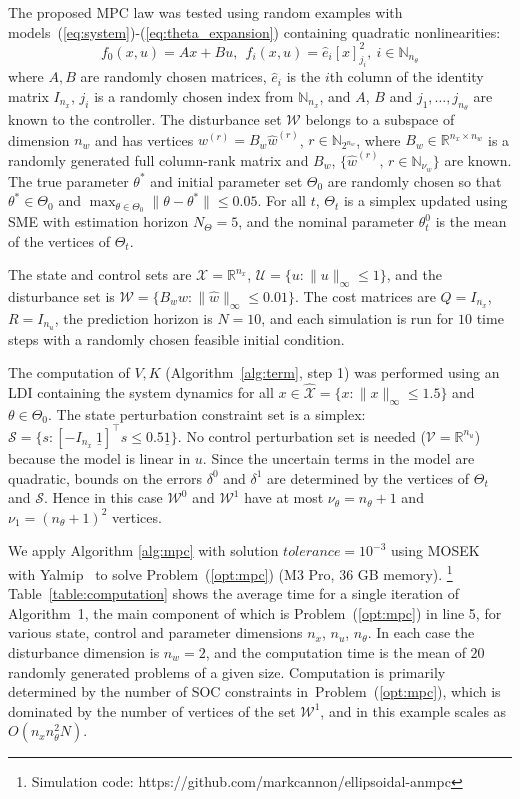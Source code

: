 \documentclass{IEEEtran}
\theoremstyle{definition}
\theoremstyle{remark}
\def\algtol{\mathit{tolerance}}
\begin{document}
The proposed MPC law was tested using random examples with models~(\ref{eq:system})-(\ref{eq:theta_expansion}) containing quadratic nonlinearities:
\[
  f_0(x,u) = Ax + Bu, \ \ f_i(x,u) = \hat{e}_i [x]_{j_i}^2, \ i\in \mathbb{N}_{n_\theta}
\]
where $A,B$ are randomly chosen matrices,
$\hat{e}_i$ is the $i$th column of the identity matrix $I_{n_x}$,
$j_i$ is a randomly chosen index from $\mathbb{N}_{n_x}$,
and $A$, $B$ and $j_1,\ldots,j_{n_\theta}$ are known to the controller.
% 
The disturbance set $\mathcal{W}$ belongs to a subspace of dimension $n_w$ and has vertices $w^{(r)} = B_w \hat{w}^{(r)}$, $r\in\mathbb{N}_{2^{n_w}}$, where $B_w\in\mathbb{R}^{n_x\times n_w}$ is a randomly generated full column-rank matrix and $B_w$, $\{\hat{w}^{(r)},\, r\in\mathbb{N}_{\nu_w}\}$ are known.
%
The true parameter $\theta^\ast$ and initial parameter set $\Theta_0$ are randomly chosen so that $\theta^\ast\in\Theta_0$ and $\max_{\theta\in\Theta_0}\| \theta - \theta^\ast\| \leq 0.05$.
For all $t$, $\Theta_t$ is a simplex updated using SME with estimation horizon $N_\Theta = 5$, and the nominal parameter $\theta^0_t$ is the mean of the vertices of $\Theta_t$.

The state and control sets are $\mathcal{X}= \mathbb{R}^{n_x}$, $\mathcal{U} = \{u: \| u \|_\infty \leq 1\}$, and the disturbance set is $\mathcal{W}=\{ B_w \hat{w} : \|\hat{w}\|_\infty \leq 0.01\}$. The cost matrices are $Q = I_{n_x}$, $R = I_{n_u}$, the prediction horizon is $N = 10$, and each simulation is run for $10$ time steps with a randomly chosen feasible initial condition.

The computation of $V,K$ (Algorithm~\ref{alg:term}, step 1) was performed using an LDI containing the system dynamics for all $x\in\hat{\mathcal{X}} = \{x : \|x\|_\infty \leq 1.5 \}$ and  $\theta\in\Theta_0$. The state perturbation constraint set is a simplex: $\mathcal{S} = \{s : [-I_{n_x} \ \underline{1}]^\top s \leq 0.5\underline{1}\}$. No control perturbation set is needed ($\mathcal{V} = \mathbb{R}^{n_u}$) because the model is linear in $u$. Since the uncertain terms in the model are quadratic, bounds on the errors $\delta^0$ and $\delta^1$ are determined by the vertices of $\Theta_t$ and $\mathcal{S}$. Hence in this case $\mathcal{W}^0$ and $\mathcal{W}^1$ have at most $\nu_\theta= n_\theta+1$ and $\nu_1 = (n_\theta+1)^2$ vertices.

We apply Algorithm \ref{alg:mpc} with solution $\algtol = 10^{-3}$ using MOSEK~\cite{mosek } with Yalmip~\cite{Yalmip} to solve Problem~(\ref{opt:mpc}) (M3 Pro, 36 GB memory).%
\footnote{Simulation code: {https://github.com/markcannon/ellipsoidal-anmpc}}
Table~\ref{table:computation} shows the average time for a single iteration of Algorithm~1, the main component of which is Problem~(\ref{opt:mpc}) in line 5, for various state, control and parameter dimensions $n_x$, $n_u$, $n_\theta$. In each case the disturbance dimension is $n_w=2$, and the computation time is the mean of $20$ randomly generated problems of a given size.
%
Computation is primarily determined
by the number of SOC constraints in~Problem~(\ref{opt:mpc}), which is dominated by the number of vertices of the set $\mathcal{W}^1$, and in this example scales as $O(n_xn_\theta^2N)$.
\end{document}
